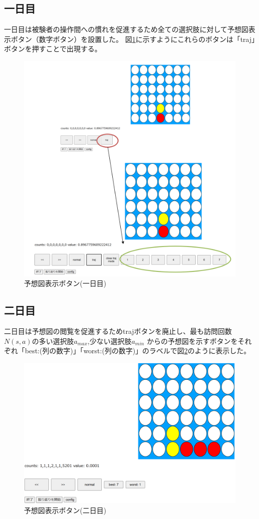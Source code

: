 \subsection{一日目}
一日目は被験者の操作間への慣れを促進するため全ての選択肢に対して予想図表示ボタン（数字ボタン）を設置した。
図\ref{fig:traj-button}に示すようにこれらのボタンは「traj」ボタンを押すことで出現する。
\begin{figure}[t]
	\centering
	\includegraphics[width=\linewidth]{./figure/traj-button.png}
	\caption{予想図表示ボタン(一日目)}
	\label{fig:traj-button}
\end{figure}
\subsection{二日目}
二日目は予想図の閲覧を促進するためtrajボタンを廃止し、最も訪問回数$N(s,a)$の多い選択肢$a_{max}$,少ない選択肢$a_{min}$
からの予想図を示すボタンをそれぞれ「best:(列の数字)」「worst:(列の数字)」のラベルで図\ref{fig:best-worst}のように表示した。
\begin{figure}[t]
	\centering
	\includegraphics[width=\linewidth]{./figure/best-worst.png}
	\caption{予想図表示ボタン(二日目)}
	\label{fig:best-worst}
\end{figure}
